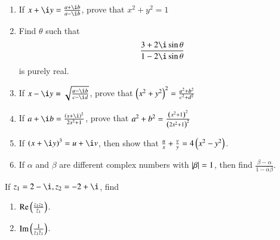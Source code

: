 \begin{enumerate}[label=\thesubsection.\arabic*,ref=\thesubsection.\theenumi,itemsep=1ex,resume*]
	\item If $x+\i y = \frac{a+\i b}{a-\i b}$, prove that
		$x^2+y^2 = 1$
	\item Find $\theta$ such that
		$$\frac{3+2\i\sin\theta}{1-2\i\sin \theta}$$
		is purely real.
	\item If $x-\i y = \sqrt{\frac{a-\i b}{c-\i d}}$, prove that
		$\left(x^2+y^2\right)^2 = \frac{a^2+b^2}{c^2+d^2}$
\item If $a+\i b = \frac{\brak{x+\i}^2}{2x^2+1}$, prove that
	${a^2+b^2}= \frac{\left(x^2+1\right)^2}{\left(2x^2+1\right)^2}$
\item If $\brak{x+\i y}^3 = {u+\i v}$, then show that 
	$\frac{u}{x}+\frac{v}{y}=4\left(x^2-y^2\right)$.
\item If $\alpha$ and $\beta$ are different complex numbers with $\left\vert\beta\right\vert=1$, then find
	$\frac{\beta-\alpha}{1-\bar{\alpha}\beta}$.
\end{enumerate}
If $z_1=2-\i,z_2=-2+\i$, find 
\begin{enumerate}[label=\thesubsection.\arabic*,ref=\thesubsection.\theenumi,itemsep=1ex,resume*]
	\item $\operatorname*{Re}\left(\frac{z_1z_2}{\bar{z}_1}\right)$.
	\item $\operatorname*{Im}\left(\frac{1}{{z_1}\bar{z}_1}\right)$.
\end{enumerate}
